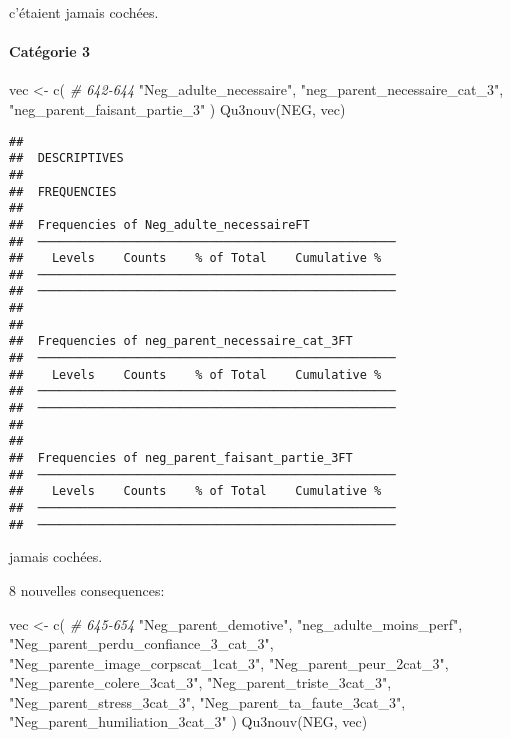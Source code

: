 \documentclass[
]{article}
\newenvironment{Shaded}{\begin{snugshade}}{\end{snugshade}}
\newcommand{\CommentTok}[1]{\textcolor[rgb]{0.56,0.35,0.01}{\textit{#1}}}
\newcommand{\FunctionTok}[1]{\textcolor[rgb]{0.00,0.00,0.00}{#1}}
\newcommand{\NormalTok}[1]{#1}
\newcommand{\OtherTok}[1]{\textcolor[rgb]{0.56,0.35,0.01}{#1}}
\newcommand{\StringTok}[1]{\textcolor[rgb]{0.31,0.60,0.02}{#1}}
\begin{document}
c'étaient jamais cochées.

\hypertarget{catuxe9gorie-3-6}{%
\paragraph{Catégorie 3}\label{catuxe9gorie-3-6}}

\begin{Shaded}
\begin{Highlighting}[]
\NormalTok{vec }\OtherTok{\textless{}{-}} \FunctionTok{c}\NormalTok{(  }\CommentTok{\# 642{-}644}
  \StringTok{"Neg\_adulte\_necessaire"}\NormalTok{,}
  \StringTok{"neg\_parent\_necessaire\_cat\_3"}\NormalTok{,}
  \StringTok{"neg\_parent\_faisant\_partie\_3"}
\NormalTok{)}
\FunctionTok{Qu3nouv}\NormalTok{(NEG, vec)}
\end{Highlighting}
\end{Shaded}

\begin{verbatim}
## 
##  DESCRIPTIVES
## 
##  FREQUENCIES
## 
##  Frequencies of Neg_adulte_necessaireFT             
##  ────────────────────────────────────────────────── 
##    Levels    Counts    % of Total    Cumulative %   
##  ────────────────────────────────────────────────── 
##  ────────────────────────────────────────────────── 
## 
## 
##  Frequencies of neg_parent_necessaire_cat_3FT       
##  ────────────────────────────────────────────────── 
##    Levels    Counts    % of Total    Cumulative %   
##  ────────────────────────────────────────────────── 
##  ────────────────────────────────────────────────── 
## 
## 
##  Frequencies of neg_parent_faisant_partie_3FT       
##  ────────────────────────────────────────────────── 
##    Levels    Counts    % of Total    Cumulative %   
##  ────────────────────────────────────────────────── 
##  ──────────────────────────────────────────────────
\end{verbatim}

jamais cochées.

8 nouvelles consequences:

\begin{Shaded}
\begin{Highlighting}[]
\NormalTok{vec }\OtherTok{\textless{}{-}} \FunctionTok{c}\NormalTok{(    }\CommentTok{\# 645{-}654}
  \StringTok{"Neg\_parent\_demotive"}\NormalTok{,}
  \StringTok{"neg\_adulte\_moins\_perf"}\NormalTok{,}
  \StringTok{"Neg\_parent\_perdu\_confiance\_3\_cat\_3"}\NormalTok{,}
  \StringTok{"Neg\_parente\_image\_corpscat\_1cat\_3"}\NormalTok{,}
  \StringTok{"Neg\_parent\_peur\_2cat\_3"}\NormalTok{,}
  \StringTok{"Neg\_parente\_colere\_3cat\_3"}\NormalTok{,}
  \StringTok{"Neg\_parent\_triste\_3cat\_3"}\NormalTok{,}
  \StringTok{"Neg\_parent\_stress\_3cat\_3"}\NormalTok{,}
  \StringTok{"Neg\_parent\_ta\_faute\_3cat\_3"}\NormalTok{,}
  \StringTok{"Neg\_parent\_humiliation\_3cat\_3"}
\NormalTok{)}
\FunctionTok{Qu3nouv}\NormalTok{(NEG, vec)}
\end{Highlighting}
\end{Shaded}
\end{document}
